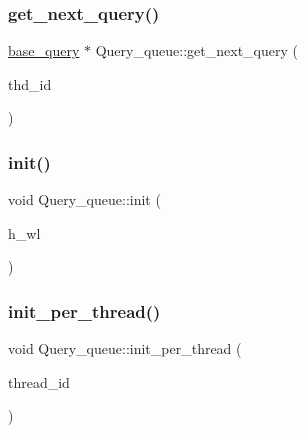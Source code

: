 \mbox{\label{classQuery__queue_ac68f34bc81dc3919b5552724f82120a2}} 
\subsubsection{\texorpdfstring{get\+\_\+next\+\_\+query()}{get\_next\_query()}}
{\footnotesize\ttfamily \hyperlink{classbase__query}{base\+\_\+query} $\ast$ Query\+\_\+queue\+::get\+\_\+next\+\_\+query (\begin{DoxyParamCaption}\item[{uint64\+\_\+t}]{thd\+\_\+id }\end{DoxyParamCaption})}

\mbox{\label{classQuery__queue_a7b11f8dff9c71abbf96d85328001803d}} 
\subsubsection{\texorpdfstring{init()}{init()}}
{\footnotesize\ttfamily void Query\+\_\+queue\+::init (\begin{DoxyParamCaption}\item[{\hyperlink{classworkload}{workload} $\ast$}]{h\+\_\+wl }\end{DoxyParamCaption})}

\mbox{\label{classQuery__queue_acad0797f9688fbada3f0c4748f95e2dc}} 
\subsubsection{\texorpdfstring{init\+\_\+per\+\_\+thread()}{init\_per\_thread()}}
{\footnotesize\ttfamily void Query\+\_\+queue\+::init\+\_\+per\+\_\+thread (\begin{DoxyParamCaption}\item[{int}]{thread\+\_\+id }\end{DoxyParamCaption})}

